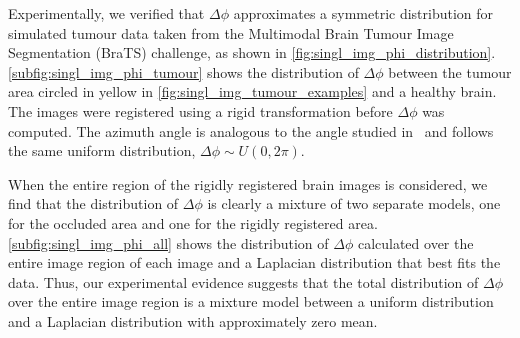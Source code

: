 Experimentally, we verified that $\Delta \phi$ approximates a symmetric
distribution for simulated tumour data taken from the Multimodal Brain Tumour
Image Segmentation (BraTS) challenge, as shown in
\cref{fig:singl_img_phi_distribution}. \cref{subfig:singl_img_phi_tumour} shows the
distribution of $\Delta \phi$ between the tumour area circled in yellow in
\cref{fig:singl_img_tumour_examples} and a healthy brain. The images were registered
using a rigid transformation before $\Delta \phi$ was computed.  The azimuth
angle is analogous to the angle studied in~\cite{tzimiropoulos2011robust} 
and follows the same uniform distribution, $\Delta \phi \sim U(0, 2\pi)$.

When the entire region of the rigidly registered brain images is considered, we
find that the distribution of $\Delta \phi$ is clearly a mixture of two separate
models, one for the occluded area and one for the rigidly registered area.
\cref{subfig:singl_img_phi_all} shows the distribution of $\Delta \phi$ calculated
over the entire image region of each image and a Laplacian distribution that
best fits the data. Thus, our experimental evidence suggests that the total
distribution of $\Delta \phi$ over the entire image region is a mixture model
between a uniform distribution and a Laplacian distribution with approximately
zero mean.
